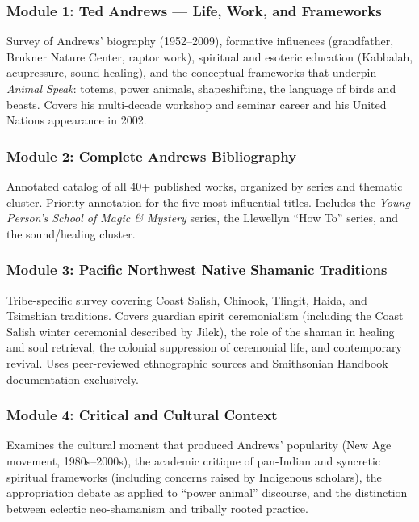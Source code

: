 \documentclass[11pt,letterpaper]{article}
\begin{document}
\subsubsection{Module 1: Ted Andrews --- Life, Work, and Frameworks}

Survey of Andrews' biography (1952--2009), formative influences (grandfather, Brukner Nature Center, raptor work), spiritual and esoteric education (Kabbalah, acupressure, sound healing), and the conceptual frameworks that underpin \emph{Animal Speak}: totems, power animals, shapeshifting, the language of birds and beasts. Covers his multi-decade workshop and seminar career and his United Nations appearance in 2002.

\subsubsection{Module 2: Complete Andrews Bibliography}

Annotated catalog of all 40+ published works, organized by series and thematic cluster. Priority annotation for the five most influential titles. Includes the \emph{Young Person's School of Magic \& Mystery} series, the Llewellyn ``How To'' series, and the sound/healing cluster.

\subsubsection{Module 3: Pacific Northwest Native Shamanic Traditions}

Tribe-specific survey covering Coast Salish, Chinook, Tlingit, Haida, and Tsimshian traditions. Covers guardian spirit ceremonialism (including the Coast Salish winter ceremonial described by Jilek), the role of the shaman in healing and soul retrieval, the colonial suppression of ceremonial life, and contemporary revival. Uses peer-reviewed ethnographic sources and Smithsonian Handbook documentation exclusively.

\subsubsection{Module 4: Critical and Cultural Context}

Examines the cultural moment that produced Andrews' popularity (New Age movement, 1980s--2000s), the academic critique of pan-Indian and syncretic spiritual frameworks (including concerns raised by Indigenous scholars), the appropriation debate as applied to ``power animal'' discourse, and the distinction between eclectic neo-shamanism and tribally rooted practice.
\end{document}
